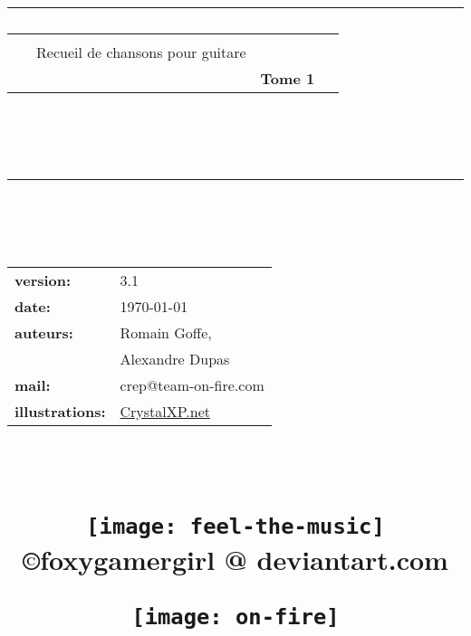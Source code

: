\newlength{\larg}
\setlength{\larg}{14.5cm}

\title{
  {\rule{\larg}{1mm}}
  \vspace{7mm}
  \begin{tabular}{l r }
    & \\
    {\Huge ~~~Recueil de chansons pour guitare} &  \\
    & {\large {\bf Tome 1~~}}\\
  \end{tabular}\\
  \vspace{2mm}
  {\rule{\larg}{1mm}}
  \vspace{0.5cm} \\
\begin{flushleft}
         \begin{tabular}{l l}
           \small {\bf version:} & \small  3.1 \\
           \small {\bf date:} & \small  \today \\
           \small {\bf auteurs:} & \small Romain Goffe, \\
           & \small Alexandre Dupas \\
           \small {\bf mail:} & \small crep@team-on-fire.com \\
           \small {\bf illustrations:}
         & \small \href{http://tux.crystalxp.net/}{CrystalXP.net} \\
         \end{tabular}\\
\end{flushleft}
         \vspace{0.5cm}
\begin{flushright}
\texttt{[image: feel-the-music]}
\small ©foxygamergirl @ deviantart.com
\end{flushright}
\begin{flushleft}
\texttt{[image: on-fire]}
\end{flushleft}
}
\author{}
\date{}
